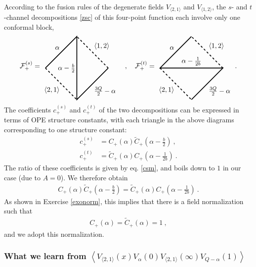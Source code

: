 \documentclass[12pt, a4paper, notitlepage, twoside]{report}
\numberwithin{equation}{section}
\theoremstyle{break}
\begin{document}
According to the fusion rules of the degenerate fields $V_{\langle 2,1\rangle}$ and $V_{\langle 1, 2\rangle}$,
the $s$- and $t$-channel decompositions \eqref{zsc} of this four-point function each involve only one 
conformal block,
\begin{align}
\mathcal{F}^{(s)}_+ = 
\begin{tikzpicture}[baseline=(current  bounding  box.center), very thick, scale = .8]
\draw[dashed] (2, 0) -- node [above right] {\!$\langle 1,2 \rangle$} (0, 2);
\draw[dashed] (-2, 0)
-- node [below left] {$\langle 2,1 \rangle$\!} (0, -2); 
\draw (-2, 0) -- node [above left] {$\alpha$\!} (0, 2) 
-- node [left] {$\alpha- \frac{b}{2}\!  $} (0, -2)
-- node [below right] {\!$\frac{3Q}{2}-\alpha$} (2, 0);
\end{tikzpicture}
\quad , \quad 
\mathcal{F}^{(t)}_+ = 
\begin{tikzpicture}[baseline=(current  bounding  box.center), very thick, scale = .8]
\draw[dashed] (2, 0) -- node [above right] {\!$\langle 1,2 \rangle$} (0, 2);
\draw[dashed] (-2, 0)
-- node [below left] {$\langle 2,1 \rangle$\!} (0, -2); 
\draw (0, 2) -- node [above left] {$\alpha$\!} (-2, 0)
-- node [above] {$\alpha- \frac{1}{2b}  $} (2, 0)
-- node [below right] {\!$\frac{3Q}{2}-\alpha$} (0, -2);
\end{tikzpicture}
\ .
\end{align}
The coefficients $c_+^{(s)}$ and $c_+^{(t)}$ of the two decompositions can be expressed in terms of OPE structure constants, with each triangle in the above diagrams corresponding to one structure constant:
\begin{align}
 c_+^{(s)} &= C_+(\alpha)\tilde{C}_+(\alpha-\tfrac{b}{2}) \ ,
 \\
 c_+^{(t)} &= \tilde{C}_+(\alpha)C_+(\alpha-\tfrac{1}{2b})\ .
\end{align}
The ratio of these coefficients is given by eq. \eqref{csm}, and boils down to $1$ in our case (due to $A=0$). 
We therefore obtain 
\begin{align}
 C_+(\alpha)\tilde{C}_+(\alpha-\tfrac{b}{2}) = \tilde{C}_+(\alpha)C_+(\alpha-\tfrac{1}{2b})\ .
\label{ctc}
\end{align}
As shown in Exercise \ref{exonorm}, this implies that there is a field normalization such that 
\begin{align}
 \boxed{C_+(\alpha) = \tilde{C}_+(\alpha) = 1}\ ,
\label{cco}
\end{align}
and we adopt this normalization. 

\subsubsection{What we learn from $
 \left\langle V_{\langle 2,1 \rangle}(x) V_\alpha(0) V_{\langle 2,1 \rangle}(\infty) V_{Q-\alpha}(1) \right\rangle$}
 
\end{document}
